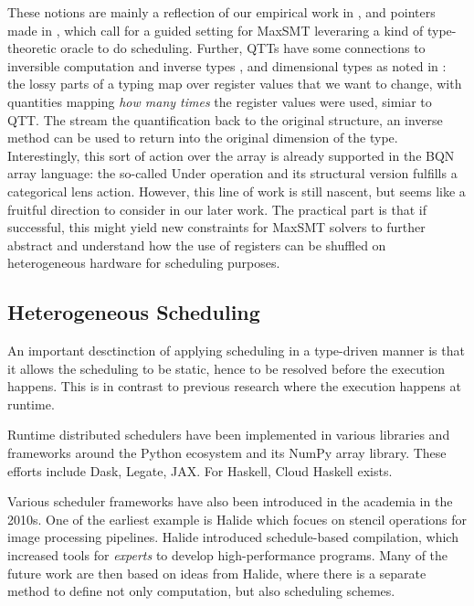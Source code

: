 \documentclass[10pt,a4paper]{article}
\begin{document}
These notions are mainly a reflection of our empirical work in \cite{UnleashingGpusHaavis2022}, and pointers made in \cite{MappingParalleMogers2022, doctoral_thesis_mogers}, which call for a guided setting for MaxSMT leveraring a kind of type-theoretic oracle to do scheduling.
Further, QTTs have some connections to inversible computation and inverse types \cite{HowToTakeTheMarsha2022}, and dimensional types as noted in \cite{TypeSystemsFoMcbrid2022}: the lossy parts of a typing map over register values that we want to change, with quantities mapping \emph{how many times} the register values were used, simiar to QTT.
The stream the quantification back to the original structure, an inverse method can be used to return into the original dimension of the type.
Interestingly, this sort of action over the array is already supported in the BQN array language: the so-called Under operation and its structural version fulfills a categorical lens action.
However, this line of work is still nascent, but seems like a fruitful direction to consider in our later work.
The practical part is that if successful, this might yield new constraints for MaxSMT solvers to further abstract and understand how the use of registers can be shuffled on heterogeneous hardware for scheduling purposes.

\subsection{Heterogeneous Scheduling}

An important desctinction of applying scheduling in a type-driven manner is that it allows the scheduling to be static, hence to be resolved before the execution happens.
This is in contrast to previous research where the execution happens at runtime.

Runtime distributed schedulers have been implemented in various libraries and frameworks around the Python ecosystem and its NumPy array library.
These efforts include Dask, Legate, JAX.
For Haskell, Cloud Haskell exists.

Various scheduler frameworks have also been introduced in the academia in the 2010s.
One of the earliest example is Halide \cite{HalideRagan2013} which focues on stencil operations for image processing pipelines.
Halide introduced schedule-based compilation, which increased tools for \emph{experts} to develop high-performance programs.
Many of the future work are then based on ideas from Halide, where there is a separate method to define not only computation, but also scheduling schemes.
\end{document}
